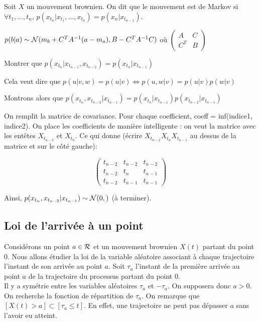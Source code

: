 \Def Soit $X$ un mouvement brownien. On dit que le mouvement est de Markov si $\forall t_1,\ldots,t_n$, $p(x_{t_n}\vert x_{t_1}, \ldots, x_{t_n}) = p(x_n \vert x_{t_{n-1}})$.

\Prop $p(b\vert a) \sim \mathcal{N}(m_b + C^T A^{-1}(a-m_a), B - C^T A^{-1} C)$ où 
$
\begin{pmatrix}
A & C \\
C^T & B
\end{pmatrix}
$

 Montrer que $p(x_{t_n} \vert x_{t_{n-1}}, x_{t_{n-2}}) = p(x_{t_n} \vert x_{t_{n-1}})$

\Rq Cela veut dire que $p(u\vert v,w) = p(u \vert v) \Leftrightarrow p(u,w\vert v) = p(u\vert v)p(w \vert v)$

Montrons alors que $p(x_{t_n},x_{t_{n-2}} \vert x_{t_{n-1}}) = p(x_{t_n}\vert x_{t_{n-1}})p(x_{t_{n-2}} \vert x_{t_{n-1}})$ 

On remplit la matrice de covariance. Pour chaque coefficient, \og coeff = inf(indice1, indice2)\fg{}. On place les coefficients de manière \og intelligente \fg{} : on veut la matrice avec les entêtes $X_{t_{n-2}}$ et $X_{t_n}$. Ce qui donne (écrire $X_{t_{n-2}} X_{t_n} X_{t_{n-1}}$ au dessus de la matrice et sur le côté gauche): 

\[
\begin{pmatrix}
  t_{n-2} & t_{n-2} & t_{n-2} \\
  t_{n-2} & t_{n}   & t_{n-1} \\
  t_{n-2} & t_{n-1} & t_{n-1}
\end{pmatrix}
\]

Ainsi, $p(x_{t_n}, x_{t_{n-2}} \vert x_{t_{n-1}}) \sim \mathcal{N}(0,)$ (à terminer).


\subsection{Loi de l'arrivée à un point}
Considérons un point $a\in \mathcal{R}$ et un mouvement brownien $X(t)$ partant du point $0$. Nous allons étudier la loi de la variable aléatoire associant à chaque trajectoire l'instant de son arrivée au point $a$. Soit $\tau_a$ l'instant de la première arrivée au point $a$ de la trajectoire du processus partant du point $0$.  \\

\Rq Il y a symétrie entre les variables aléatoires $\tau_a$ et $-\tau_a$. On supposera donc $a>0$. \\

On recherche la fonction de répartition de $\tau_a$. On remarque que $[X(t) > a] \subset [\tau_a \leq t]$. En effet, une trajectoire ne peut pas dépasser $a$ sans l'avoir eu atteint.

